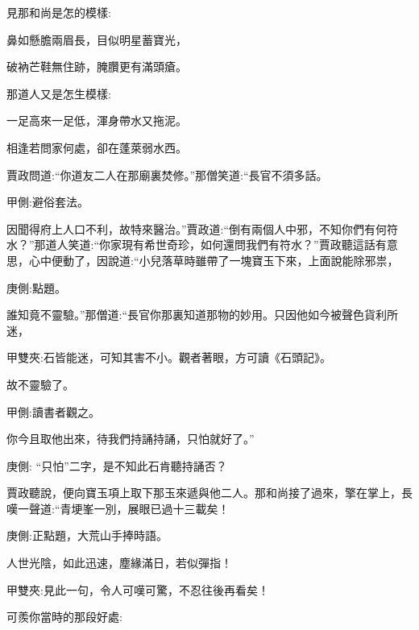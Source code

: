 \begin{parag}
    見那和尚是怎的模樣:
\end{parag}


\begin{poem}
    \begin{pl}鼻如懸膽兩眉長，目似明星蓄寶光，\end{pl}

    \begin{pl}破衲芒鞋無住跡，腌臢更有滿頭瘡。\end{pl}
\end{poem}


\begin{parag}
    那道人又是怎生模樣:
\end{parag}


\begin{poem}
    \begin{pl}一足高來一足低，渾身帶水又拖泥。\end{pl}

    \begin{pl}相逢若問家何處，卻在蓬萊弱水西。\end{pl}
\end{poem}


\begin{parag}
    賈政問道:“你道友二人在那廟裏焚修。”那僧笑道:“長官不須多話。\begin{note}甲側:避俗套法。\end{note}因聞得府上人口不利，故特來醫治。”賈政道:“倒有兩個人中邪，不知你們有何符水？”那道人笑道:“你家現有希世奇珍，如何還問我們有符水？”賈政聽這話有意思，心中便動了，因說道:“小兒落草時雖帶了一塊寶玉下來，上面說能除邪祟，\begin{note}庚側:點題。\end{note}誰知竟不靈驗。”那僧道:“長官你那裏知道那物的妙用。只因他如今被聲色貨利所迷，\begin{note}甲雙夾:石皆能迷，可知其害不小。觀者著眼，方可讀《石頭記》。\end{note}故不靈驗了。\begin{note}甲側:讀書者觀之。\end{note}你今且取他出來，待我們持誦持誦，只怕就好了。”\begin{note}庚側: “只怕”二字，是不知此石肯聽持誦否？\end{note}
\end{parag}


\begin{parag}
    賈政聽說，便向寶玉項上取下那玉來遞與他二人。那和尚接了過來，擎在掌上，長嘆一聲道:“青埂峯一別，展眼已過十三載矣！\begin{note}庚側:正點題，大荒山手捧時語。\end{note}人世光陰，如此迅速，塵緣滿日，若似彈指！\begin{note}甲雙夾:見此一句，令人可嘆可驚，不忍往後再看矣！\end{note}可羨你當時的那段好處:
\end{parag}


